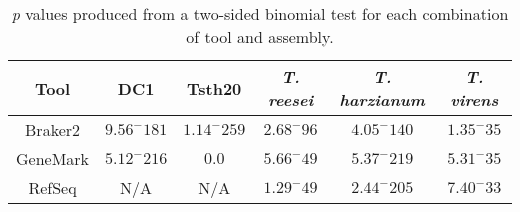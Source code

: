 \begin{table}
  \begin{center}
    \begin{tabular}{|c|c|c|c|c|c|}
      \hline
      Tool & DC1 & Tsth20 & \textit{T. reesei} & \textit{T. harzianum} & \textit{T. virens} \\ \hline
      Braker2 & $9.56^-181$ & $1.14^-259$ & $2.68^-96$ & $4.05^-140$ & $1.35^-35$ \\ \hline
      GeneMark & $5.12^-216$ & $0.0$ & $5.66^-49$ & $5.37^-219$ & $5.31^-35$ \\ \hline
      RefSeq & N/A & N/A & $1.29^-49$ & $2.44^-205$ & $7.40^-33$ \\ \hline
    \end{tabular}
  \end{center}
  \caption{\textit{p} values produced from a two-sided binomial test
    for each combination of tool and assembly.}
  \label{table:gc-binomial}
\end{table}
